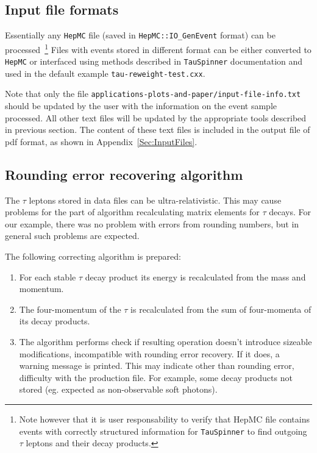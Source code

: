 \documentclass{article}
\begin{document}
\subsection{Input file formats}
Essentially any {\tt HepMC} \cite{Dobbs:2001ck} file (saved in {\tt HepMC::IO\_GenEvent} format) can be processed~\footnote{Note however that
it is user responsability to verify that HepMC file contains events with correctly structured information for {\tt TauSpinner}
to find outgoing $\tau$ leptons and their decay products.}
Files with events stored in different format can be either converted to {\tt HepMC} or interfaced 
using  methods described in {\tt TauSpinner} documentation 
and used in the default example {\tt tau-reweight-test.cxx}.

Note that only the file {\tt applications-plots-and-paper/input-file-info.txt}
should be updated by the user with the information on the event sample processed.
All other text files will be updated by the appropriate tools described in previous section.
The content of these text files is included in the output file of pdf format, 
as shown in Appendix~\ref{Sec:InputFiles}.

\subsection{Rounding error recovering algorithm}
The $\tau$ leptons stored in data files can be ultra-relativistic. This may cause 
problems for the part of algorithm recalculating matrix elements 
for $\tau$ decays. For our example, there was no problem with errors from rounding numbers,
but in general such problems are expected.

The following correcting algorithm is prepared:
\begin{enumerate}
\item
  For each stable $\tau$ decay product its energy is recalculated from the mass
and momentum.
\item
The four-momentum of the $\tau$ is recalculated from the sum of four-momenta of its 
decay products.
\item
The algorithm performs check if resulting operation doesn't introduce sizeable
modifications, incompatible with rounding error recovery. If it does, a
 warning message is printed. 
 This may indicate other than rounding error,
 difficulty with the production file. 
For example, some decay products not stored (eg. expected as non-observable
soft photons).
\end{enumerate}
\end{document}

